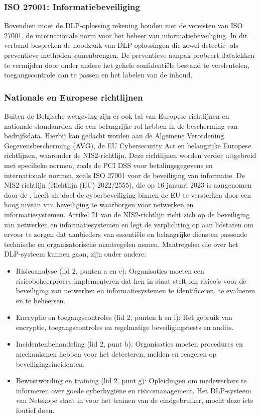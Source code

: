 \subsubsection{ISO 27001: Informatiebeveiliging}%

Bovendien moet de DLP-oplossing rekening houden met de vereisten van ISO 27001, de internationale norm voor het beheer van informatiebeveiliging. 
In dit verband bespreken \textcite{Alsanabani2020} de noodzaak van DLP-oploss\-ingen die zowel detectie- als preventieve methoden samenbrengen. 
De preventieve aanpak probeert datalekken te vermijden door onder andere het gehele confidentiële bestand te versleutelen, toegangscontrole aan te passen en het labelen van de inhoud.

\subsubsection{Nationale en Europese richtlijnen}%

Buiten de Belgische wetgeving zijn er ook tal van Europese richtlijnen en nationale standaarden die een belangrijke rol hebben in de bescherming van bedrijfsdata. 
Hierbij kan gedacht worden aan de Algemene Verordening Gegevensbescherming (AVG), de EU Cybersecurity Act en belangrijke Europese richtlijnen, waaronder de NIS2-richtlijn. 
Deze richtlijnen worden verder uitgebreid met specifieke normen, zoals de PCI DSS voor betalingsgegevens en internationale normen, zoals ISO 27001 voor de beveiliging van informatie. 
De NIS2-richtlijn (Richtlijn (EU) 2022/2555), die op 16 januari 2023 is aangenomen door de \cite{nis2directive}, 
heeft als doel de cyberbeveiliging binnen de EU te versterken door een hoog niveau van beveiliging te waarborgen voor netwerken en informatiesystemen. 
Artikel 21 van de NIS2-richtlijn richt zich op de beveiliging van netwerken en informatiesystemen en legt de verplichting op aan lidstaten om 
ervoor te zorgen dat aanbieders van essentiële en belangrijke diensten passende technische en organisatorische maatregelen nemen. 
Maatregelen die over het DLP-systeem kunnen gaan, zijn onder andere: 

\begin{itemize}
    \item Risicoanalyse (lid 2, punten a en e): Organisaties moeten een risicobeheerproces implementeren dat hen in staat stelt om risico's voor de beveiliging van netwerken en informatiesystemen te identificeren, te evalueren en te beheersen.
    \item Encryptie en toegangscontroles (lid 2, punten h en i): Het gebruik van encryptie, toegangscontroles en regelmatige beveiligingstests en audits.
    \item Incidentenbehandeling (lid 2, punt b): Organisaties moeten procedures en mechanismen hebben voor het detecteren, melden en reageren op beveiligingsincidenten.
    \item Bewustwording en training (lid 2, punt g): Opleidingen om medewerkers te informeren over goede cyberhygiëne en risicomanagement. \autocite{nis2directive} Het DLP-systeem van Netskope staat in voor het trainen van de eindgebruiker, mocht deze iets foutief doen.
\end{itemize}

